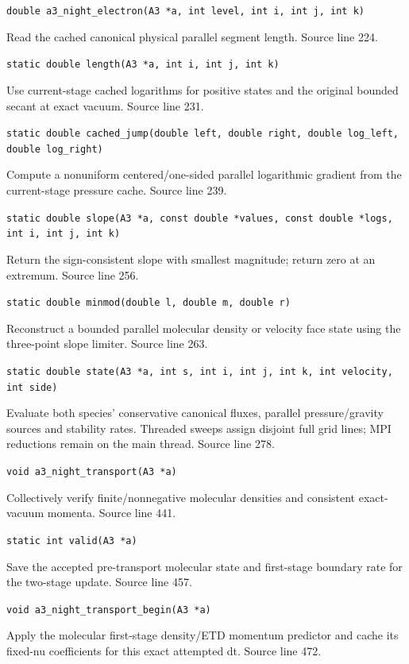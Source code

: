 \begin{description}[style=nextline,leftmargin=0pt,labelindent=0pt,labelwidth=0pt,labelsep=0pt]
{\small\nolinkurl{double a3_night_electron(A3 *a, int level, int i, int j, int k)}}
\item[\texttt{length}] Read the cached canonical physical parallel segment length. Source line 224.\par
{\small\nolinkurl{static double length(A3 *a, int i, int j, int k)}}
\item[\texttt{cached\_jump}] Use current-stage cached logarithms for positive states and the original bounded secant at exact vacuum. Source line 231.\par
{\small\nolinkurl{static double cached_jump(double left, double right, double log_left, double log_right)}}
\item[\texttt{slope}] Compute a nonuniform centered/one-sided parallel logarithmic gradient from the current-stage pressure cache. Source line 239.\par
{\small\nolinkurl{static double slope(A3 *a, const double *values, const double *logs, int i, int j, int k)}}
\item[\texttt{minmod}] Return the sign-consistent slope with smallest magnitude; return zero at an extremum. Source line 256.\par
{\small\nolinkurl{static double minmod(double l, double m, double r)}}
\item[\texttt{state}] Reconstruct a bounded parallel molecular density or velocity face state using the three-point slope limiter. Source line 263.\par
{\small\nolinkurl{static double state(A3 *a, int s, int i, int j, int k, int velocity, int side)}}
\item[\texttt{a3\_night\_transport}] Evaluate both species' conservative canonical fluxes, parallel pressure/gravity sources and stability rates. Threaded sweeps assign disjoint full grid lines; MPI reductions remain on the main thread. Source line 278.\par
{\small\nolinkurl{void a3_night_transport(A3 *a)}}
\item[\texttt{valid}] Collectively verify finite/nonnegative molecular densities and consistent exact-vacuum momenta. Source line 441.\par
{\small\nolinkurl{static int valid(A3 *a)}}
\item[\texttt{a3\_night\_transport\_begin}] Save the accepted pre-transport molecular state and first-stage boundary rate for the two-stage update. Source line 457.\par
{\small\nolinkurl{void a3_night_transport_begin(A3 *a)}}
\item[\texttt{a3\_night\_predict}] Apply the molecular first-stage density/ETD momentum predictor and cache its fixed-nu coefficients for this exact attempted dt. Source line 472.\par

\end{description}

